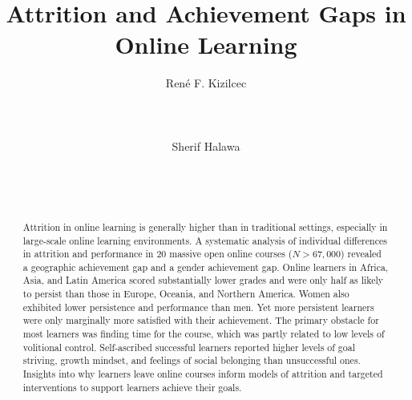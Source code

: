 \documentclass{sigchi}\usepackage[]{graphicx}\usepackage[]{color}
\begin{document}
\title{Attrition and Achievement Gaps in Online Learning}

\author{
  \alignauthor Ren\'{e} F. Kizilcec\\
    \\
    \\
    \\
  \alignauthor Sherif Halawa\\
    \\
    \\
    \\
}

\maketitle

\begin{abstract}
Attrition in online learning is generally higher than in traditional settings, especially in large-scale online learning environments. A systematic analysis of individual differences in attrition and performance in 20 massive open online courses ($N>67,000$) revealed a geographic achievement gap and a gender achievement gap. Online learners in Africa, Asia, and Latin America scored substantially lower grades and were only half as likely to persist than those in Europe, Oceania, and Northern America. Women also exhibited lower persistence and performance than men. Yet more persistent learners were only marginally more satisfied with their achievement. The primary obstacle for most learners was finding time for the course, which was partly related to low levels of volitional control. Self-ascribed successful learners reported higher levels of goal striving, growth mindset, and feelings of social belonging than unsuccessful ones. Insights into why learners leave online courses inform models of attrition and targeted interventions to support learners achieve their goals.
\end{abstract}


\end{document}
